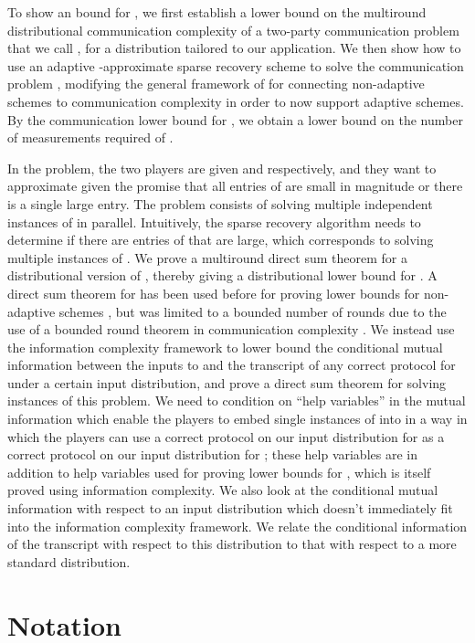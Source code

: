 \documentclass[twoside,leqno,twocolumn]{article}
\begin{document}
To show an  bound for , 
we first establish a lower bound on the multiround distributional 
communication complexity
of a two-party communication problem that we call , for a 
distribution tailored to our application. 
We then show how to use an adaptive -approximate 
 sparse
recovery scheme  
to solve the communication problem , modifying the 
general framework
of \cite{PW11} for connecting non-adaptive schemes to communication 
complexity in
order to now support adaptive schemes. 
By the communication lower bound for , 
we obtain a lower bound on the number of measurements required of . 

In the  problem, the two players are given  and  respectively,
and they want to approximate  given the promise that all entries
of  are small in magnitude or there is a single large entry. The 
problem consists of solving multiple independent instances of  in parallel. Intuitively,
the sparse recovery algorithm needs to determine if there are entries of  that are large, which
corresponds to solving multiple instances of . 
We prove a multiround direct sum theorem for a distributional version of , 
thereby giving a distributional lower bound for . A direct sum theorem for 
has been used before for proving lower bounds
for non-adaptive schemes \cite{PW11}, but was limited to a bounded
number of rounds due to the use of a bounded round theorem in
communication complexity \cite{br11}.
We instead use the information complexity framework \cite{BJKS04} to 
lower bound the conditional mutual information between the inputs to 
and the transcript of any correct protocol for  under a certain input distribution, and prove a 
direct sum theorem for solving  instances of this problem. 
We need to condition on ``help variables'' in the mutual information which enable the players
to embed single instances of  into  in a way in which the players can use
a correct protocol on our input distribution for  
as a correct protocol on
our input distribution for ; these help variables are 
in addition to help variables used for proving
lower bounds for , which
is itself proved using information complexity. We also look 
at the conditional mutual information with respect to an input distribution 
which doesn't immediately fit into the information complexity framework. 
We relate the conditional information of the transcript with respect to this
distribution to that with respect to a more standard distribution. 
\section{Notation}
\end{document}
